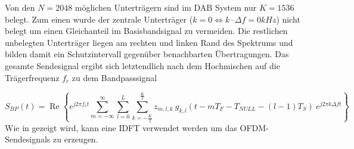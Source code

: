 \begin{center}
\end{center}

Von den $N = 2048$ möglichen Unterträgern sind im DAB System nur $K = 1536$ belegt. Zum einen wurde der zentrale Unterträger ($k=0 \Leftrightarrow k\cdot \Delta f = 0kHz$) nicht belegt um einen Gleichanteil im Basisbandsignal zu vermeiden. Die restlichen unbelegten Unterträger liegen am rechten und linken Rand des Spektrums und bilden damit ein Schutzintervall gegenüber benachbarten Übertragungen.
Das gesamte Sendesignal ergibt sich letztendlich nach dem Hochmischen auf die Trägerfrequenz $f_c$ zu dem Bandpasssignal

\begin{equation}
S_{BP}(t) = \operatorname{Re} \left\{e^{j2 \pi f_c t} \sum \limits_{m=-\infty}^{\infty} \sum \limits_{l=0}^{L}   \sum \limits_{k=- \frac{K}{2}}^{\frac{K}{2}} z_{m,l,k} \: g_{k,l}(t-mT_F-T_{NULL}-(l-1)T_S) \: e^{j2\pi k \Delta f t}\right\}
\end{equation}
Wie in \cite{ofdm:idft} gezeigt wird, kann eine \ac{IDFT} verwendet werden um das OFDM-Sendesignals zu erzeugen.